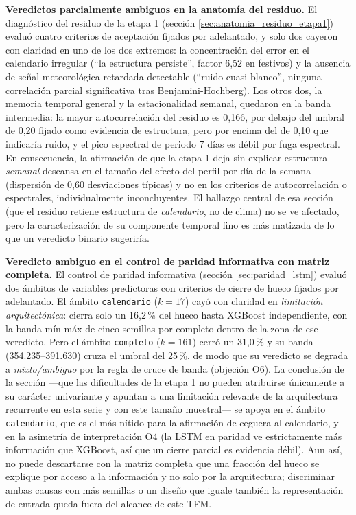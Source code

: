 \textbf{Veredictos parcialmente ambiguos en la anatomía del residuo.} El diagnóstico del
residuo de la etapa 1 (sección \ref{sec:anatomia_residuo_etapa1}) evaluó cuatro criterios
de aceptación fijados por adelantado, y solo dos cayeron con claridad en uno de los dos
extremos: la concentración del error en el calendario irregular (``la estructura
persiste'', factor 6,52 en festivos) y la ausencia de señal meteorológica retardada
detectable (``ruido cuasi-blanco'', ninguna correlación parcial significativa tras
Benjamini-Hochberg). Los otros dos, la memoria temporal general y la estacionalidad
semanal, quedaron en la banda intermedia: la mayor autocorrelación del residuo es 0,166,
por debajo del umbral de 0,20 fijado como evidencia de estructura, pero por encima del de
0,10 que indicaría ruido, y el pico espectral de periodo 7 días es débil por fuga
espectral. En consecuencia, la afirmación de que la etapa 1 deja sin explicar estructura
\emph{semanal} descansa en el tamaño del efecto del perfil por día de la semana
(dispersión de 0,60 desviaciones típicas) y no en los criterios de autocorrelación o
espectrales, individualmente inconcluyentes. El hallazgo central de esa sección (que el
residuo retiene estructura de \emph{calendario}, no de clima) no se ve afectado, pero la
caracterización de su componente temporal fino es más matizada de lo que un veredicto
binario sugeriría.

\textbf{Veredicto ambiguo en el control de paridad informativa con matriz completa.} El
control de paridad informativa (sección \ref{sec:paridad_lstm}) evaluó dos ámbitos de
variables predictoras con criterios de cierre de hueco fijados por adelantado. El ámbito
\texttt{calendario} ($k=17$) cayó con claridad en \emph{limitación arquitectónica}: cierra
solo un 16,2\,\% del hueco hasta XGBoost independiente, con la banda mín-máx de cinco
semillas por completo dentro de la zona de ese veredicto. Pero el ámbito \texttt{completo}
($k=161$) cerró un 31,0\,\% y su banda (354.235--391.630) cruza el umbral del 25\,\%, de
modo que su veredicto se degrada a \emph{mixto/ambiguo} por la regla de cruce de banda
(objeción O6). La conclusión de la sección —que las dificultades de la etapa 1 no pueden
atribuirse únicamente a su carácter univariante y apuntan a una limitación relevante de la
arquitectura recurrente en esta serie y con este tamaño muestral— se apoya en el ámbito
\texttt{calendario}, que es el más nítido para la afirmación de ceguera al calendario, y en
la asimetría de interpretación O4 (la LSTM en paridad ve estrictamente más información que
XGBoost, así que un cierre parcial es evidencia débil). Aun así, no puede descartarse con
la matriz completa que una fracción del hueco se explique por acceso a la información y no
solo por la arquitectura; discriminar ambas causas con más semillas o un diseño que iguale
también la representación de entrada queda fuera del alcance de este TFM.


